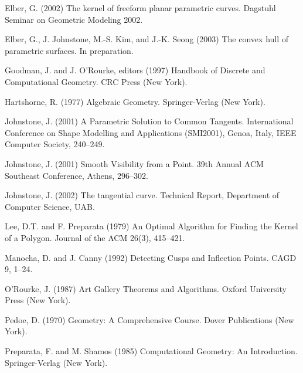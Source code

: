 \documentclass{sig-alternate}
\begin{document}

\begin{thebibliography}{99}

Elber, G. (2002)
The kernel of freeform planar parametric curves.
Dagstuhl Seminar on Geometric Modeling 2002.

Elber, G., J. Johnstone, M.-S. Kim, and J.-K. Seong (2003)
The convex hull of parametric surfaces.
In preparation.

Goodman, J. and J. O'Rourke, editors (1997)
Handbook of Discrete and Computational Geometry.
CRC Press (New York).

Hartshorne, R. (1977)
Algebraic Geometry.
Springer-Verlag (New York).

Johnstone, J. (2001)
A Parametric Solution to Common Tangents.
International Conference on Shape Modelling and Applications (SMI2001),
Genoa, Italy, IEEE Computer Society, 240--249.

Johnstone, J. (2001)
Smooth Visibility from a Point.
39th Annual ACM Southeast Conference, Athens, 296--302.

Johnstone, J. (2002)
The tangential curve.
Technical Report, Department of Computer Science, UAB.

Lee, D.T. and F. Preparata (1979)
An Optimal Algorithm for Finding the Kernel of a Polygon.
Journal of the ACM 26(3), 415--421.

Manocha, D. and J. Canny (1992)
Detecting Cusps and Inflection Points.
CAGD 9, 1--24.

O'Rourke, J. (1987)
Art Gallery Theorems and Algorithms.
Oxford University Press (New York).

Pedoe, D. (1970)
Geometry: A Comprehensive Course.
Dover Publications (New York).

Preparata, F. and M. Shamos (1985)
Computational Geometry: An Introduction.
Springer-Verlag (New York).

\end{thebibliography}

\balancecolumns
\end{document}
